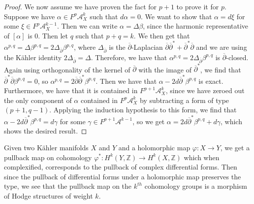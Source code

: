\documentclass[psamsfonts, 12pt]{amsart}
\theoremstyle{definition}
\theoremstyle{remark}
\newcommand{\Z}{\mathbb{Z}}
\newcommand{\dbar}{\overline{\partial}}
\begin{document}
\begin{proof}
We now assume we have proven the fact for $p+1$ to prove it for $p$. Suppose
we have $\alpha \in F^p\mathcal{A}^k_X$ such that $d\alpha = 0$. We want to
show that $\alpha = d\xi$ for some $\xi \in F^p \mathcal{A}^{k-1}_X$. Then
we can write $\alpha = \Delta\beta$, since the harmonic representative of
$[\alpha]$ is $0$. Then let $q$ such that $p+q = k$. We then get that
$\alpha^{p,q} = \Delta\beta^{p,q} = 2\Delta_{\dbar}\beta^{p,q}$, where
$\Delta_{\dbar}$ is the $\dbar$-Laplacian $\dbar\dbar^* + \dbar^*\dbar$ and we
are using the K\"ahler identity $2\Delta_{\dbar} = \Delta$. Therefore, we
have that $\alpha^{p,q} = 2\Delta_{\dbar}\beta^{p,q}$ is $\dbar$-closed.
Again using orthogonality of the kernel of $\dbar$ with the image of
$\dbar^*$, we find that $\dbar^*\dbar\beta^{p,q} = 0$, so
$\alpha^{p,q} = 2\dbar\dbar^*\beta^{p,q}$. Then we have that
$\alpha - 2d\dbar^*\beta^{p,q}$ is exact. Furthermore, we have that it is
contained in $F^{p+1}\mathcal{A}^k_X$, since we have zeroed out the only
component of $\alpha$ contained in $F^p\mathcal{A}^k_X$ by subtracting a form
of type $(p+1, q-1)$. Applying the induction hypothesis to this form, we
find that $\alpha - 2d\dbar^*\beta^{p,q} = d\gamma$ for some
$\gamma \in F^{p+1}\mathcal{A}^{k-1}$, so we get
$\alpha = 2d\dbar^*\beta^{p,q} + d\gamma$, which shows the desired result.
\end{proof}
%
Given two K\"ahler manifolds $X$ and $Y$ and a holomorphic map $\varphi : X \to Y$, we
get a pullback map on cohomology $\varphi^* : H^k(Y,\Z) \to H^k(X,\Z)$ which
when complexified, corresponds to the pullback of complex differential forms.
Then since the pullback of differential forms under a holomorphic map
preserves the type, we see that the pullback map on the $k^{th}$ cohomology
groups is a morphism of Hodge structures of weight $k$. \\
%
\end{document}
